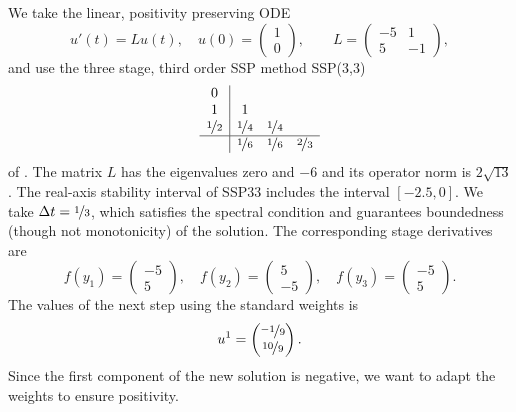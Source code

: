 \documentclass[a4paper]{article}
\numberwithin{equation}{section}
\theoremstyle{plain}
\theoremstyle{definition}
\numberwithin{theorem}{section}
\newcommand{\dt}{{\Delta t}}
\newcommand{\1}{\mathbbm{1}}
\begin{document}
We take the linear, positivity preserving ODE
\cite{kopecz_unconditionally_2018}
\begin{equation}
  u'(t) = L u(t),
  \quad
  u(0) = \begin{pmatrix} 1 \\ 0 \end{pmatrix},
  \qquad
  L = \begin{pmatrix} -5 & 1 \\ 5 & -1\end{pmatrix},
\end{equation}
and use the three stage, third order SSP method SSP(3,3)
\begin{align}
\begin{array}{c|ccc}
0 &  &  & \\
1 & 1 &  & \\
\nicefrac{1}{2} & \nicefrac{1}{4} & \nicefrac{1}{4} & \\
\hline
 & \nicefrac{1}{6} & \nicefrac{1}{6} & \nicefrac{2}{3}\\
\end{array}
\end{align}
of \cite{shu1988efficient}.
The matrix $L$ has the eigenvalues zero and $-6$ and its operator
norm is $2 \sqrt{13}$.
The real-axis stability interval of SSP33 includes the interval $[-2.5,0]$.
We take $\dt = \nicefrac{1}{3}$, which satisfies the spectral
condition and guarantees boundedness (though not monotonicity)
of the solution.
The corresponding stage derivatives are
\begin{equation}
  f(y_1) = \begin{pmatrix} -5 \\ 5 \end{pmatrix},\quad
  f(y_2) = \begin{pmatrix} 5 \\ -5 \end{pmatrix},\quad
  f(y_3) = \begin{pmatrix} -5 \\ 5 \end{pmatrix}.
\end{equation}
The values of the next step using the standard weights is
\begin{equation}
  u^1 = \begin{pmatrix} \nicefrac{-1}{9} \\ \nicefrac{10}{9} \end{pmatrix}.
\end{equation}
Since the first component of the new solution is negative,
we want to adapt the weights to ensure positivity.
\end{document}
